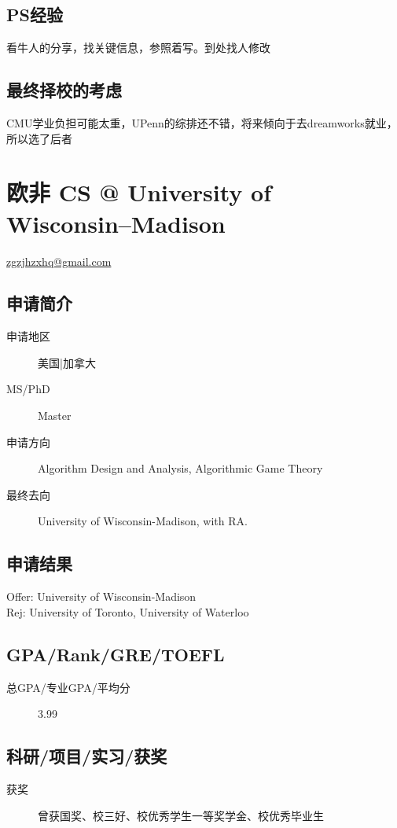 \documentclass[11pt,fleqn,openany]{book} %
\begin{document}
\subsection*{PS经验}
看牛人的分享，找关键信息，参照着写。到处找人修改
\subsection*{最终择校的考虑}
CMU学业负担可能太重，UPenn的综排还不错，将来倾向于去dreamworks就业，所以选了后者
\clearpage
\section{欧非 CS @ University of Wisconsin--Madison}
\hfill \href{mailto:zgzjhzxhq@gmail.com}{zgzjhzxhq@gmail.com}

\noindent\begin{minipage}[t]{0.45\textwidth}
\subsection*{申请简介}
\begin{description}
\item[申请地区] 美国|加拿大
\item[MS/PhD] Master
\item[申请方向] Algorithm Design and Analysis, Algorithmic Game Theory
\item[最终去向] University of Wisconsin-Madison, with RA.
\end{description}
\end{minipage}
\hfill
\begin{minipage}[t]{0.45\textwidth}
\subsection*{申请结果}
\noindent Offer: University of Wisconsin-Madison\\
Rej: University of Toronto, University of Waterloo
\end{minipage}
\subsection*{GPA/Rank/GRE/TOEFL}
\begin{description}
\item[总GPA/专业GPA/平均分] 3.99
\end{description}

\subsection*{科研/项目/实习/获奖}
\begin{description}
\item[获奖] 曾获国奖、校三好、校优秀学生一等奖学金、校优秀毕业生
\end{description}
\end{document}
